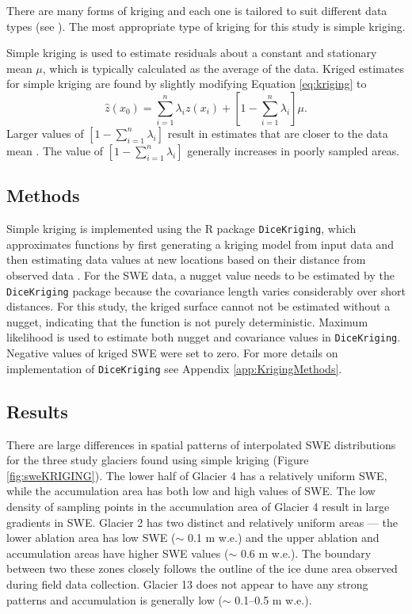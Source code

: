 \documentclass{sfuthesis}
\begin{document}
There are many forms of kriging and each one is tailored to suit different data types (see \cite{Li2014}). The most appropriate type of kriging for this study is simple kriging. 

Simple kriging is used to estimate residuals about a constant and stationary mean $\mu$, which is typically calculated as the average of the data. Kriged estimates for simple kriging are found by slightly modifying Equation \ref{eq:kriging} to 
\begin{equation}
\hat{z}(x_0) = \sum_{i=1}^{n} \lambda_i z(x_i) +\left[1-\sum_{i=1}^{n} \lambda_i \right]\mu.
\end{equation}
Larger values of $\left[1-\sum_{i=1}^{n} \lambda_i \right]$ result in estimates that are closer to the data mean \citep{Li2008}. The value of $\left[1-\sum_{i=1}^{n} \lambda_i \right]$ generally increases in poorly sampled areas. 

\subsection{Methods}
\label{sec:kriging_methods}

Simple kriging is implemented using the R package \texttt{DiceKriging}, which approximates functions by first generating a kriging model from input data and then estimating data values at new locations based on their distance from observed data \citep{Roustant2012}. For the SWE data, a nugget value needs to be estimated by the \texttt{DiceKriging} package because the covariance length varies considerably over short distances. For this study, the kriged surface cannot not be estimated without a nugget, indicating that the function is not purely deterministic. Maximum likelihood is used to estimate both nugget and covariance values in \texttt{DiceKriging}. Negative values of kriged SWE were set to zero. For more details on implementation of \texttt{DiceKriging} see Appendix \ref{app:KrigingMethods}.

\subsection{Results}

There are large differences in spatial patterns of interpolated SWE distributions for the three study glaciers found using simple kriging (Figure \ref{fig:sweKRIGING}). The lower half of Glacier 4 has a relatively uniform SWE, while the accumulation area has both low and high values of SWE. The low density of sampling points in the accumulation area of Glacier 4 result in large gradients in SWE. Glacier 2 has two distinct and relatively uniform areas --- the lower ablation area has low SWE ($\sim$ 0.1 m w.e.) and the upper ablation and accumulation areas have higher SWE values ($\sim$ 0.6 m w.e.). The boundary between two these zones closely follows the outline of the ice dune area observed during field data collection. Glacier 13 does not appear to have any strong patterns and accumulation is generally low ($\sim$ 0.1--0.5 m w.e.). 
\end{document}
